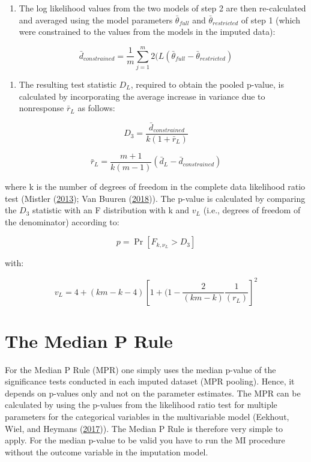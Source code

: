 \documentclass[
]{book}
\providecommand{\tightlist}{%
  \setlength{\itemsep}{0pt}\setlength{\parskip}{0pt}}
\begin{document}
\begin{enumerate}
\def\labelenumi{\arabic{enumi}.}
\setcounter{enumi}{3}
\tightlist
\item
  The log likelihood values from the two models of step 2 are then
  re-calculated and averaged using the model parameters
  \(\bar\theta_{full}\) and \(\bar\theta_{restricted}\) of step 1 (which
  were constrained to the values from the models in the imputed data):
\end{enumerate}

\[\bar d_{constrained} = \frac{1}{m} \sum_{j=1}^m 2(L(\bar\theta_{full} - \bar\theta_{restricted})\]

\begin{enumerate}
\def\labelenumi{\arabic{enumi}.}
\setcounter{enumi}{4}
\tightlist
\item
  The resulting test statistic \(D_L\), required to obtain the pooled
  p-value, is calculated by incorporating the average increase in
  variance due to nonresponse \(\bar r_L\) as follows:
\end{enumerate}

\[D_3 = \frac{\bar d_{constrained}}{k(1+\bar r_L)}\]

\[\bar r_L = \frac{m+1}{k(m-1)}(\bar d_L-\bar d_{constrained})\]

where k is the number of degrees of freedom in the complete data
likelihood ratio test (Mistler
(\protect\hyperlink{ref-Mistler2013}{2013}); Van Buuren
(\protect\hyperlink{ref-VanBuuren2018}{2018})). The p-value is
calculated by comparing the \(D_3\) statistic with an F distribution
with k and \(v_L\) (i.e., degrees of freedom of the denominator)
according to:

\[p = \Pr[F_{k,\nu_L}>D_3]\]

with:

\[v_L = 4 + (km-k-4)[1+(1-\frac{2}{(km-k)}\frac{1}{(r_L)}]^2\]

\hypertarget{the-median-p-rule}{%
\section{The Median P Rule}\label{the-median-p-rule}}

For the Median P Rule (MPR) one simply uses the median p-value of the
significance tests conducted in each imputed dataset (MPR pooling).
Hence, it depends on p-values only and not on the parameter estimates.
The MPR can be calculated by using the p-values from the likelihood
ratio test for multiple parameters for the categorical variables in the
multivariable model (Eekhout, Wiel, and Heymans
(\protect\hyperlink{ref-Eekhout2017}{2017})). The Median P Rule is
therefore very simple to apply. For the median p-value to be valid you
have to run the MI procedure without the outcome variable in the
imputation model.
\end{document}
